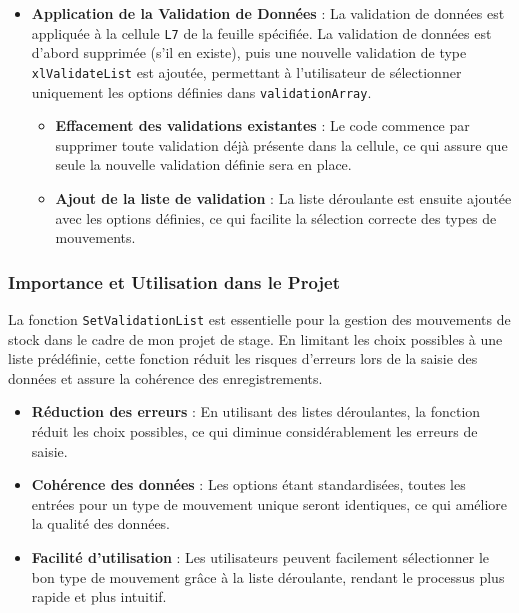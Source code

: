 \documentclass[a4paper, oneside, 12pt, final]{extreport}
\begin{document}
\begin{itemize}
    \item \textbf{Application de la Validation de Données} : La validation de données est appliquée à la cellule \texttt{L7} de la feuille spécifiée. La validation de données est d'abord supprimée (s'il en existe), puis une nouvelle validation de type \texttt{xlValidateList} est ajoutée, permettant à l'utilisateur de sélectionner uniquement les options définies dans \texttt{validationArray}.
        \begin{itemize}
            \item \textbf{Effacement des validations existantes} : Le code commence par supprimer toute validation déjà présente dans la cellule, ce qui assure que seule la nouvelle validation définie sera en place.
            \item \textbf{Ajout de la liste de validation} : La liste déroulante est ensuite ajoutée avec les options définies, ce qui facilite la sélection correcte des types de mouvements.
        \end{itemize}
\end{itemize}

\subsubsection{Importance et Utilisation dans le Projet}
La fonction \texttt{SetValidationList} est essentielle pour la gestion des mouvements de stock dans le cadre de mon projet de stage. En limitant les choix possibles à une liste prédéfinie, cette fonction réduit les risques d'erreurs lors de la saisie des données et assure la cohérence des enregistrements.

\begin{itemize}
    \item \textbf{Réduction des erreurs} : En utilisant des listes déroulantes, la fonction réduit les choix possibles, ce qui diminue considérablement les erreurs de saisie.
    \item \textbf{Cohérence des données} : Les options étant standardisées, toutes les entrées pour un type de mouvement unique seront identiques, ce qui améliore la qualité des données.
    \item \textbf{Facilité d'utilisation} : Les utilisateurs peuvent facilement sélectionner le bon type de mouvement grâce à la liste déroulante, rendant le processus plus rapide et plus intuitif.
\end{itemize}
\end{document}
